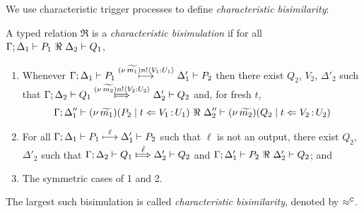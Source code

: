 We use characteristic trigger processes to define \emph{characteristic bisimilarity}: 

\begin{definition}
\label{d:fwb}
	A typed relation $\Re$ is a {\em  characteristic bisimulation} if 
	for all $\horel{\Gamma}{\Delta_1}{P_1}{\ \Re \ }{\Delta_2}{Q_1}$, 
%
	\begin{enumerate}[1)]
		\item 
				Whenever 
				$\Gamma; \Delta_1 \vdash P_1 \stackrel{(\nu\, \widetilde{m_1}) n ! \langle V_1: U_1 \rangle}{\longmapsto} \Delta_1' \vdash P_2$ 
				then there exist 
				$Q_2$, $V_2$, $\Delta'_2$ such that 
				$\horel{\Gamma}{\Delta_2}{Q_1}{\Hby{\news{\widetilde{m_2}}\bactout{n}{V_2: U_2}}}{\Delta_2'}{Q_2}$
				and, for fresh $t$,
%
				\[
					\Gamma; \Delta''_1  \proves  {\newsp{\widetilde{m_1}}{P_2 \Par \ftrigger{t}{V_1}{U_1}}}
	 				\ \Re\ 
					\Delta''_2 \proves {\newsp{\widetilde{m_2}}{Q_2 \Par \ftrigger{t}{V_2}{U_2}}}
				\]

		\item	
				For all $\Gamma; \Delta_1 \vdash P_1 \stackrel{\ell}{\longmapsto} \Delta_1' \vdash P_2$ such that 
				$\ell$ is not an output, there exist $Q_2$, $\Delta'_2$ such that 
				$\horel{\Gamma}{\Delta_2}{Q_1}{\Hby{\hat{\ell}}}{\Delta_2'}{Q_2}$
				and
				$\horel{\Gamma}{\Delta_1'}{P_2}{\ \Re \ }{\Delta_2'}{Q_2}$; and 

		\item	The symmetric cases of 1 and 2.                
	\end{enumerate}
%
	The largest such bisimulation is called \emph{characteristic bisimilarity}, denoted by $\approx^\mathtt{C}$.
\end{definition}


